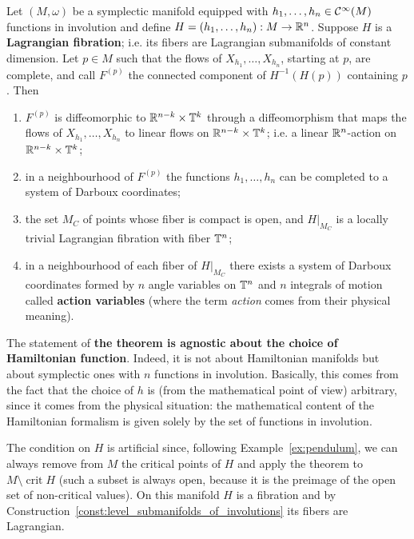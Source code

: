\documentclass[main.tex]{subfiles}
\begin{document}
\begin{theorem}
\label{th:arnold_liouville}
	Let $(M, \omega)$ be a symplectic manifold equipped with $h_1, \ldots, h_n \in \mathcal{C}^\infty(M)$ functions in involution and define $H = (h_1, \ldots, h_n): M \to \mathbb{R}^n$. Suppose $H$ is a \textbf{Lagrangian fibration}; i.e. its fibers are Lagrangian submanifolds of constant dimension. Let $p \in M$ such that the flows of $X_{h_1}, \ldots, X_{h_n}$, starting at $p$, are complete\footnotemark, and call $F^{(p)}$ the connected component of $H^{-1}(H(p))$ containing $p$. Then
	\begin{enumerate}
		\item $F^{(p)}$ is diffeomorphic to $\mathbb{R}^{n-k} \times \mathbb{T}^k$ through a diffeomorphism that maps the flows of $X_{h_1}, \ldots, X_{h_n}$ to linear flows on $\mathbb{R}^{n-k} \times \mathbb{T}^k$; i.e. a linear $\mathbb{R}^n$-action on $\mathbb{R}^{n-k} \times \mathbb{T}^k$;
		\item in a neighbourhood of $F^{(p)}$ the functions $h_1, \ldots, h_n$ can be completed to a system of Darboux coordinates;
		\item the set $M_C$ of points whose fiber is compact is open, and $H\vert_{M_C}$ is a locally trivial Lagrangian fibration with fiber $\mathbb{T}^n$;
		\item in a neighbourhood of each fiber of $H\vert_{M_C}$ there exists a system of Darboux coordinates formed by $n$ angle variables on $\mathbb{T}^n$ and $n$ integrals of motion called \textbf{action variables} (where the term \emph{action} comes from their physical meaning).
	\end{enumerate}
\end{theorem}
\begin{remark}
	The statement of \textbf{the theorem is agnostic about the choice of Hamiltonian function}. Indeed, it is not about Hamiltonian manifolds but about symplectic ones with $n$ functions in involution. Basically, this comes from the fact that the choice of $h$ is (from the mathematical point of view) arbitrary, since it comes from the physical situation: the mathematical content of the Hamiltonian formalism is given solely by the set of functions in involution.
\end{remark}
\begin{remark}
	The condition on $H$ is artificial since, following Example~\ref{ex:pendulum}, we can always remove from $M$ the critical points of $H$ and apply the theorem to $M\setminus \operatorname{crit}H$ (such a subset is always open, because it is the preimage of the open set of non-critical values). On this manifold $H$ is a fibration and by Construction~\ref{const:level_submanifolds_of_involutions} its fibers are Lagrangian.
\end{remark}
\end{document}

